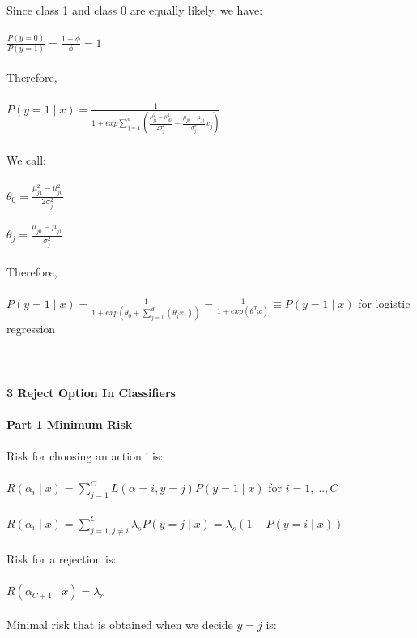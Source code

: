 \documentclass[12pt]{article}
\begin{document}
\\
\\
Since class 1 and class 0 are equally likely, we have:
\\
\\
$\frac {P(y = 0)}{P(y = 1)} =  \frac {1 - \phi}{\phi} = 1$
\\
\\
Therefore,
\\
\\
$P(y = 1 \mid x) = \frac{1} {1 + exp \sum_{j=1}^d (\frac{\mu_{j 1}^2 - \mu_{j 0}^2}{2\sigma_j^2} + \frac{\mu_{j 0} - \mu_{j 1}}{\sigma_j ^2} x_j)}$
\\
\\
We call:
\\
\\
$\theta_0 = \frac{\mu_{j 1}^2 - \mu_{j 0}^2}{2\sigma_j^2}$
\\
\\
$\theta_j = \frac{\mu_{j 0} - \mu_{j 1}}{\sigma_j ^2} $
\\
\\
Therefore,
\\
\\
$P(y = 1 \mid x) = \frac{1}{1+exp(\theta_0 +  \sum_{j=1}^d (\theta_j x_j))} = \frac{1}{1 + exp (\theta^T x)} \equiv P(y = 1 \mid x) $ for logistic regression\\
\\
\\
\\
\noindent \textbf{3 Reject Option In Classifiers}
\\
\\
\noindent \textbf{Part 1 Minimum Risk}
\\
\\
Risk for choosing an action i is:\\
\\
\indent $R (\alpha_i \mid x) = \sum_{j = 1}^C L(\alpha = i, y = j) P(y = 1 \mid x)$ for $i = 1 , ..., C$ \\
\\
\indent $R (\alpha_i \mid x) = \sum_{j = 1, j \neq i}^C \lambda_s P(y = j \mid x) = \lambda_s (1 - P(y = i \mid x))$\\
\\
Risk for a rejection is:\\
\\
\indent $R (\alpha_{C+ 1} \mid x) = \lambda_r$ \\
\\
Minimal risk that is obtained when we decide $y = j$ is:\\
\end{document}
